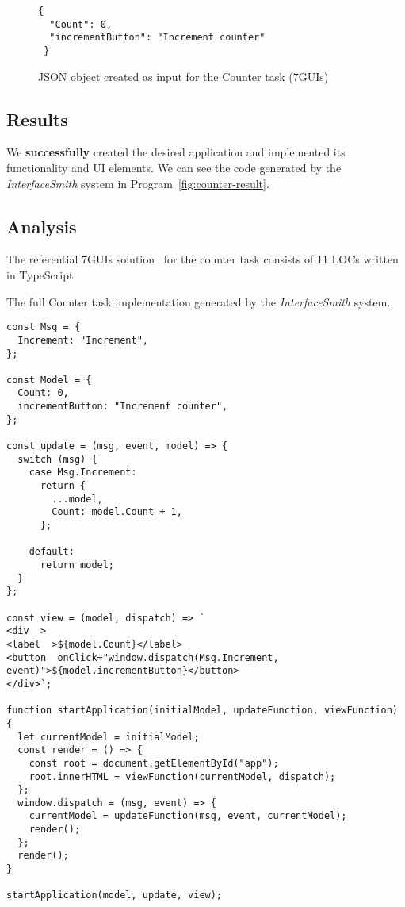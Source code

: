 \begin{figure}[htbp]
	\caption{JSON object created as input for the Counter task (7GUIs)}
	\label{fig:counter-json}
	\begin{lstlisting}
{
  "Count": 0,
  "incrementButton": "Increment counter"
 }
    \end{lstlisting}
\end{figure}
\medskip
\subsection{Results}
We \textbf{successfully} created the desired application and implemented its functionality and UI elements.
We can see the code generated by the \emph{InterfaceSmith} system in Program~\ref{fig:counter-result}.
\medskip
\subsection{Analysis}
The referential 7GUIs solution~\cite{7guis-React-TypeScript-MobX/src/app/guis/counter.tsx} for the counter task consists of 11 LOCs written in TypeScript.


\begin{listing}[p]
	\caption {The full Counter task implementation generated by the \emph{InterfaceSmith} system.}
	\label{fig:counter-result}
	\begin{lstlisting}
const Msg = {
  Increment: "Increment",
};

const Model = {
  Count: 0,
  incrementButton: "Increment counter",
};

const update = (msg, event, model) => {
  switch (msg) {
    case Msg.Increment:
      return {
        ...model,
        Count: model.Count + 1,
      };

    default:
      return model;
  }
};

const view = (model, dispatch) => `
<div  >
<label  >${model.Count}</label>
<button  onClick="window.dispatch(Msg.Increment, event)">${model.incrementButton}</button>
</div>`;

function startApplication(initialModel, updateFunction, viewFunction) {
  let currentModel = initialModel;
  const render = () => {
    const root = document.getElementById("app");
    root.innerHTML = viewFunction(currentModel, dispatch);
  };
  window.dispatch = (msg, event) => {
    currentModel = updateFunction(msg, event, currentModel);
    render();
  };
  render();
}

startApplication(model, update, view);
\end{lstlisting}
\end{listing}


